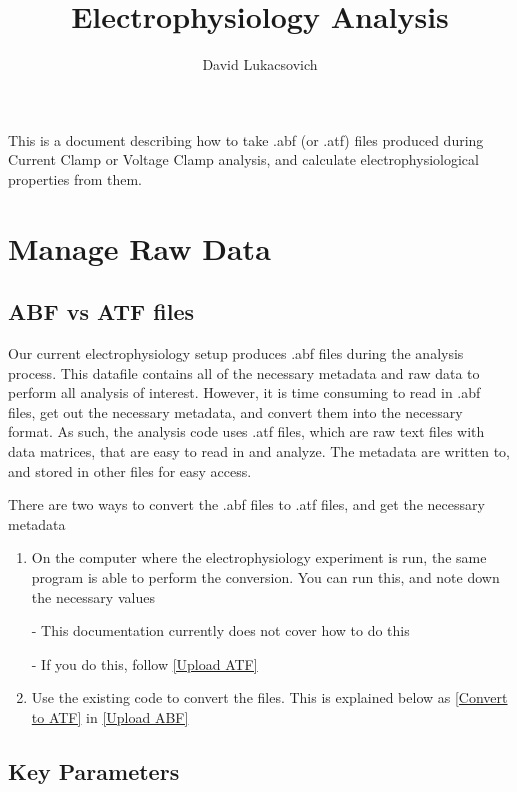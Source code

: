 \documentclass{article}
\title{Electrophysiology Analysis}
\author{David Lukacsovich}
\begin{document}
\maketitle

This is a document describing how to take .abf (or .atf) files produced during Current Clamp or Voltage Clamp analysis, and calculate electrophysiological properties from them.

\section{Manage Raw Data}

\subsection{ABF vs ATF files}

Our current electrophysiology setup produces .abf files during the analysis process. This datafile contains all of the necessary metadata and raw data to perform all analysis of interest. However, it is time consuming to read in .abf files, get out the necessary metadata, and convert them into the necessary format. As such, the analysis code uses .atf files, which are raw text files with data matrices, that are easy to read in and analyze. The metadata are written to, and stored in other files for easy access.

There are two ways to convert the .abf files to .atf files, and get the necessary metadata
\begin{enumerate}
    \item On the computer where the electrophysiology experiment is run, the same program is able to perform the conversion. You can run this, and note down the necessary values
    
    - This documentation currently does not cover how to do this
    
    - If you do this, follow \ref{Upload ATF}
    
    \item Use the existing code to convert the files. This is explained below as \ref{Convert to ATF} in \ref{Upload ABF}
    
\end{enumerate}

\subsection{Key Parameters} \label{key parameters}
\end{document}

